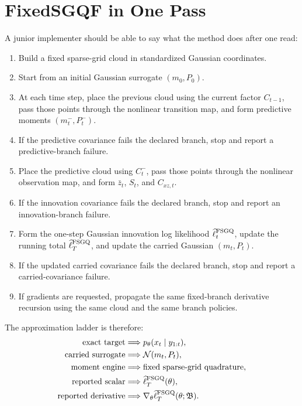 \documentclass[11pt]{article}
\numberwithin{equation}{section}
\newcommand{\N}{\mathcal N}
\newcommand{\ellhat}{\widehat\ell}
\newcommand{\branch}{\mathfrak B}
\begin{document}
\section{FixedSGQF in One Pass}
\label{sec:algorithm-one-pass}

A junior implementer should be able to say what the method does after one read:
\begin{enumerate}[leftmargin=0.3in]
  \item Build a fixed sparse-grid cloud in standardized Gaussian coordinates.
  \item Start from an initial Gaussian surrogate \((m_0,P_0)\).
  \item At each time step, place the previous cloud using the current factor
  \(C_{t-1}\), pass those points through the nonlinear transition map, and form
  predictive moments \((m_t^-,P_t^-)\).
  \item If the predictive covariance fails the declared branch, stop and report
  a predictive-branch failure.
  \item Place the predictive cloud using \(C_t^-\), pass those points through the
  nonlinear observation map, and form \(\bar z_t\), \(S_t\), and
  \(C_{xz,t}\).
  \item If the innovation covariance fails the declared branch, stop and report
  an innovation-branch failure.
  \item Form the one-step Gaussian innovation log likelihood
  \(\ellhat_t^{\rm FSGQ}\), update the running total
  \(\ellhat_T^{\rm FSGQ}\), and update the carried Gaussian
  \((m_t,P_t)\).
  \item If the updated carried covariance fails the declared branch, stop and
  report a carried-covariance failure.
  \item If gradients are requested, propagate the same fixed-branch derivative
  recursion using the same cloud and the same branch policies.
\end{enumerate}

The approximation ladder is therefore:
\begin{equation}
\begin{aligned}
  \text{exact target} &\Longrightarrow p_\theta(x_t\mid y_{1:t}), \\
  \text{carried surrogate} &\Longrightarrow \N(m_t,P_t), \\
  \text{moment engine} &\Longrightarrow \text{fixed sparse-grid quadrature}, \\
  \text{reported scalar} &\Longrightarrow \ellhat_T^{\rm FSGQ}(\theta), \\
  \text{reported derivative} &\Longrightarrow \nabla_\theta \ellhat_T^{\rm FSGQ}(\theta;\branch).
\end{aligned}
\label{eq:approximation-ladder}
\end{equation}
\end{document}
